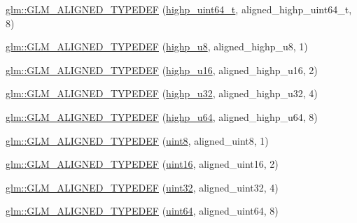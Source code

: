 \begin{DoxyCompactItemize}
\hyperlink{group__gtx__type__aligned_ga71e646f7e301aa422328194162c9c998}{glm\+::\+G\+L\+M\+\_\+\+A\+L\+I\+G\+N\+E\+D\+\_\+\+T\+Y\+P\+E\+D\+EF} (\hyperlink{group__gtc__type__precision_ga6e66f40c5909bfc872b068187fa6029e}{highp\+\_\+uint64\+\_\+t}, aligned\+\_\+highp\+\_\+uint64\+\_\+t, 8)
\item 
\hyperlink{group__gtx__type__aligned_ga8942e09f479489441a7a5004c6d8cb66}{glm\+::\+G\+L\+M\+\_\+\+A\+L\+I\+G\+N\+E\+D\+\_\+\+T\+Y\+P\+E\+D\+EF} (\hyperlink{group__gtc__type__precision_ga8a60abe782749c504fb5ae51eb8b49cc}{highp\+\_\+u8}, aligned\+\_\+highp\+\_\+u8, 1)
\item 
\hyperlink{group__gtx__type__aligned_gaab32497d6e4db16ee439dbedd64c5865}{glm\+::\+G\+L\+M\+\_\+\+A\+L\+I\+G\+N\+E\+D\+\_\+\+T\+Y\+P\+E\+D\+EF} (\hyperlink{group__gtc__type__precision_ga9da2178d7501d9c0f225fa1a7b70cb45}{highp\+\_\+u16}, aligned\+\_\+highp\+\_\+u16, 2)
\item 
\hyperlink{group__gtx__type__aligned_gaaadbb34952eca8e3d7fe122c3e167742}{glm\+::\+G\+L\+M\+\_\+\+A\+L\+I\+G\+N\+E\+D\+\_\+\+T\+Y\+P\+E\+D\+EF} (\hyperlink{group__gtc__type__precision_gae8e8a2c712653891a03c171795286ac5}{highp\+\_\+u32}, aligned\+\_\+highp\+\_\+u32, 4)
\item 
\hyperlink{group__gtx__type__aligned_ga92024d27c74a3650afb55ec8e024ed25}{glm\+::\+G\+L\+M\+\_\+\+A\+L\+I\+G\+N\+E\+D\+\_\+\+T\+Y\+P\+E\+D\+EF} (\hyperlink{group__gtc__type__precision_ga6006ea883d3c0491791650b2fb84de39}{highp\+\_\+u64}, aligned\+\_\+highp\+\_\+u64, 8)
\item 
\hyperlink{group__gtx__type__aligned_gabde1d0b4072df35453db76075ab896a6}{glm\+::\+G\+L\+M\+\_\+\+A\+L\+I\+G\+N\+E\+D\+\_\+\+T\+Y\+P\+E\+D\+EF} (\hyperlink{group__gtc__type__precision_ga1a7dcd8aac97cc8020817c94049deff2}{uint8}, aligned\+\_\+uint8, 1)
\item 
\hyperlink{group__gtx__type__aligned_ga06c296c9e398b294c8c9dd2a7693dcbb}{glm\+::\+G\+L\+M\+\_\+\+A\+L\+I\+G\+N\+E\+D\+\_\+\+T\+Y\+P\+E\+D\+EF} (\hyperlink{group__gtc__type__precision_gad8c2939e1fdd8e5828b31d95c52255d5}{uint16}, aligned\+\_\+uint16, 2)
\item 
\hyperlink{group__gtx__type__aligned_gacf1744488c96ebd33c9f36ad33b2010a}{glm\+::\+G\+L\+M\+\_\+\+A\+L\+I\+G\+N\+E\+D\+\_\+\+T\+Y\+P\+E\+D\+EF} (\hyperlink{group__gtc__type__precision_ga202b6a53c105fcb7e531f9b443518451}{uint32}, aligned\+\_\+uint32, 4)
\item 
\hyperlink{group__gtx__type__aligned_ga3328061a64c20ba59d5f9da24c2cd059}{glm\+::\+G\+L\+M\+\_\+\+A\+L\+I\+G\+N\+E\+D\+\_\+\+T\+Y\+P\+E\+D\+EF} (\hyperlink{group__gtc__type__precision_gae3632bf9b37da66233d78930dd06378a}{uint64}, aligned\+\_\+uint64, 8)

\end{DoxyCompactItemize}
